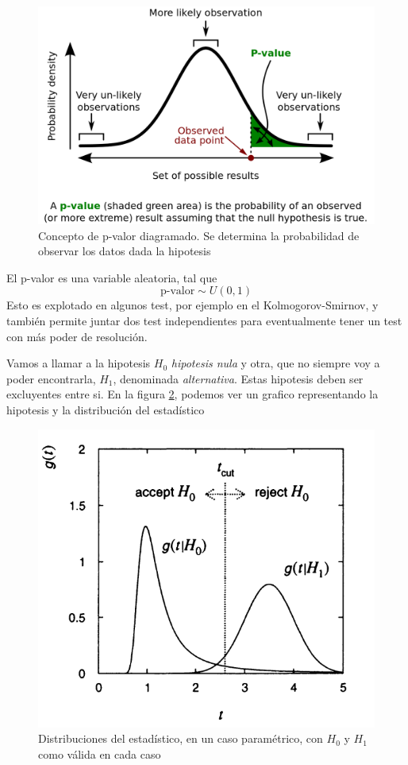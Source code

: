 \documentclass{article}
\numberwithin{equation}{section} %
\begin{document}
\begin{figure}[H]
\centering
\includegraphics[scale=0.4]{p-value}
\caption{Concepto de p-valor diagramado. Se determina la probabilidad de observar los datos dada la hipotesis}
\label{fig:p-value}
\end{figure}

El p-valor es una variable aleatoria, tal que
\begin{equation}
\text{p-valor} \sim U(0,1)
\end{equation}
Esto es explotado en algunos test, por ejemplo en el Kolmogorov-Smirnov, y también permite juntar dos test independientes para eventualmente tener un test con más poder de resolución.

Vamos a llamar a la hipotesis $H_0$ \emph{hipotesis nula} y otra, que no siempre voy a poder encontrarla, $H_1$, denominada \emph{alternativa}. Estas hipotesis deben ser excluyentes entre si. En la figura \ref{fig:test_h0_h1}, podemos ver un grafico representando la hipotesis y la distribución del estadístico

\begin{figure}[H]
\centering
\includegraphics[scale=0.45]{test_h0_h1}
\caption{Distribuciones del estadístico, en un caso paramétrico, con $H_0$ y $H_1$ como válida en cada caso}
\label{fig:test_h0_h1}
\end{figure}
\end{document}
